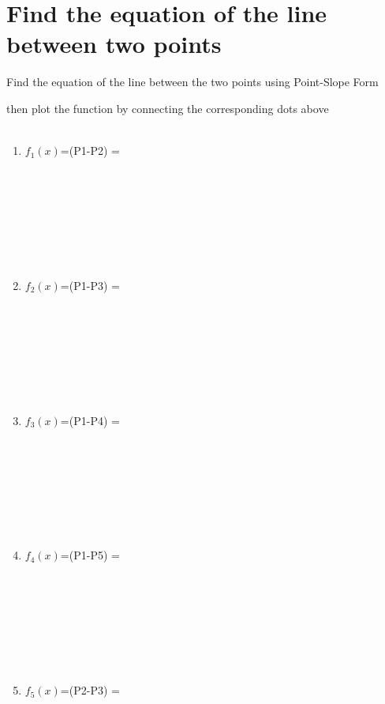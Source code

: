 \documentclass[12pt]{article}
\begin{document}
\vspace{10cm}
\setcounter{section}{0}
\section{Find the equation of the line between two points}
\hspace{1cm} Find the equation of the line between the two points using Point-Slope Form
\par
\noindent
\hspace{1cm} then plot the function by connecting the corresponding dots above\\\\
\begin{minipage}[t]{0.6\textwidth}
    \begin{enumerate}
        \item $f_1(x)$=(P1-P2) =
        \\\\\\\\\\\\\\\\
        \item $f_2(x)$=(P1-P3) =
        \\\\\\\\\\\\\\\\
        \item $f_3(x)$=(P1-P4) =
        \\\\\\\\\\\\\\\\
        \item $f_4(x)$=(P1-P5) =
        \\\\\\\\\\\\\\\\
        \item $f_5(x)$=(P2-P3) =
        
        
    \end{enumerate}
\end{minipage}
\end{document}
